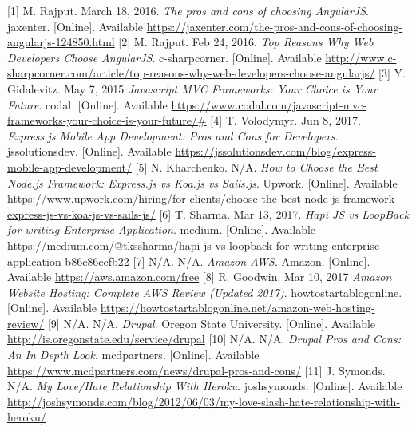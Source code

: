 \documentclass[onecolumn, draftclsnofoot,10pt, compsoc]{IEEEtran}
\begin{document}
[1] M. Rajput. March 18, 2016. \textit{The pros and cons of choosing AngularJS}. jaxenter. [Online]. Available \url{https://jaxenter.com/the-pros-and-cons-of-choosing-angularjs-124850.html}
[2] M. Rajput. Feb 24, 2016. \textit{Top Reasons Why Web Developers Choose AngularJS}. c-sharpcorner. [Online]. Available \url{http://www.c-sharpcorner.com/article/top-reasons-why-web-developers-choose-angularjs/}
[3] Y. Gidalevitz. May 7, 2015 \textit{Javascript MVC Frameworks: Your Choice is Your Future}. codal. [Online].  Available \url{https://www.codal.com/javascript-mvc-frameworks-your-choice-is-your-future/#}
[4] T. Volodymyr. Jun 8, 2017. \textit{Express.js Mobile App Development: Pros and Cons for Developers}. jssolutionsdev. [Online].  Available \url{https://jssolutionsdev.com/blog/express-mobile-app-development/}
[5] N. Kharchenko. N/A. \textit{How to Choose the Best Node.js Framework: Express.js vs Koa.js vs Sails.js}. Upwork. [Online]. Available \url{https://www.upwork.com/hiring/for-clients/choose-the-best-node-js-framework-express-js-vs-koa-js-vs-sails-js/}
[6] T. Sharma. Mar 13, 2017. \textit{Hapi JS vs LoopBack for writing Enterprise Application}. medium. [Online]. Available \url{https://medium.com/@tkssharma/hapi-js-vs-loopback-for-writing-enterprise-application-b86c86ccfb22}
[7] N/A. N/A. \textit{Amazon AWS}. Amazon. [Online]. Available \url{https://aws.amazon.com/free}
[8] R. Goodwin. Mar 10, 2017 \textit{Amazon Website Hosting: Complete AWS Review (Updated 2017)}. howtostartablogonline. [Online]. Available \url{https://howtostartablogonline.net/amazon-web-hosting-review/}
[9] N/A. N/A. \textit{ Drupal}. Oregon State University. [Online]. Available \url{http://is.oregonstate.edu/service/drupal}
[10] N/A. N/A. \textit{Drupal Pros and Cons: An In Depth Look}. mcdpartners. [Online]. Available \url{https://www.mcdpartners.com/news/drupal-pros-and-cons/}
[11] J. Symonds. N/A. \textit{My Love/Hate Relationship With Heroku}. joshsymonds. [Online]. Available \url{http://joshsymonds.com/blog/2012/06/03/my-love-slash-hate-relationship-with-heroku/}
\end{document}
